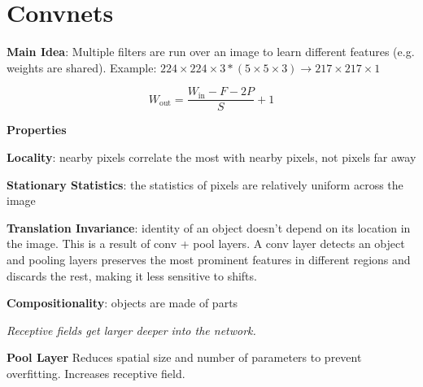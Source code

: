 \section{Convnets}

\textbf{Main Idea}: Multiple filters are run over an image to learn different features (e.g. weights are shared). Example: $224 \times 224 \times 3 * (5 \times 5 \times 3) \rightarrow 217 \times 217 \times 1$ 

$$W_{\text{out}} = \frac{W_{\text{in}} - F - 2P}{S} + 1$$

\textbf{Properties}

\textbf{Locality}: nearby pixels correlate the most with nearby pixels, not pixels far away

\textbf{Stationary Statistics}: the statistics of pixels are relatively uniform across the image

\textbf{Translation Invariance}: identity of an object doesn’t depend on its location in the image. This is a result of conv + pool layers. A conv layer detects an object and pooling layers preserves the most prominent features in different regions and discards the rest, making it less sensitive to shifts.

\textbf{Compositionality}: objects are made of parts

\textit{Receptive fields get larger deeper into the network.}

\textbf{Pool Layer}
Reduces spatial size and number of parameters to prevent overfitting. Increases receptive field.

